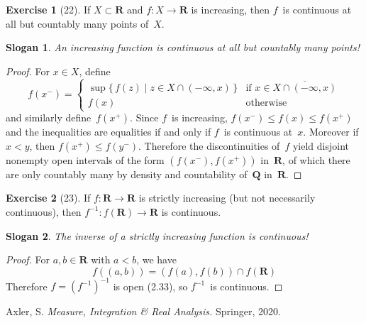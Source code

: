 \documentclass[letterpaper,12pt]{article}
\newcommand{\Q}{\mathbf{Q}}
\newcommand{\R}{\mathbf{R}}
\newcommand{\sect}{\cap}
\newcommand{\inv}[1]{#1^{-1}}
\newcommand{\closure}[1]{\overline{#1}}
\theoremstyle{definition}
\newtheorem*{exer}{Exercise}
\theoremstyle{remark}
\theoremstyle{plain}
\newtheorem*{slogan}{Slogan}
\begin{document}
\begin{exer}[22]
If \(X\subset\R\) and \(f:X\to\R\) is increasing, then \(f\)~is continuous at all but countably many points of~\(X\).
\end{exer}
\begin{slogan}
An increasing function is continuous at all but countably many points!
\end{slogan}
\begin{proof}
For \(x\in X\), define
\[f(x^-)=\begin{cases}
\sup\{\,f(z)\mid z\in X\sect(-\infty,x)\,\}&\text{if }x\in\closure{X\sect(-\infty,x)}\\
f(x)&\text{otherwise}
\end{cases}\]
and similarly define~\(f(x^+)\). Since \(f\)~is increasing, \(f(x^-)\le f(x)\le f(x^+)\) and the inequalities are equalities if and only if \(f\)~is continuous at~\(x\). Moreover if \(x<y\), then \(f(x^+)\le f(y^-)\). Therefore the discontinuities of~\(f\) yield disjoint nonempty open intervals of the form \((f(x^-),f(x^+))\) in~\(\R\), of which there are only countably many by density and countability of~\(\Q\) in~\(\R\).
\end{proof}

\begin{exer}[23]
If \(f:\R\to\R\) is strictly increasing (but not necessarily continuous), then \(\inv{f}:f(\R)\to\R\) is continuous.
\end{exer}
\begin{slogan}
The inverse of a strictly increasing function is continuous!
\end{slogan}
\begin{proof}
For \(a,b\in\R\) with \(a<b\), we have
\[f((a,b))=(f(a),f(b))\sect f(\R)\]
Therefore \(f=\inv{(\inv{f})}\) is open (2.33), so \(\inv{f}\)~is continuous.
\end{proof}

\newpage
\begin{thebibliography}{0}
 Axler, S. \textit{Measure, Integration \& Real Analysis.} Springer, 2020.
\end{thebibliography}
\end{document}
